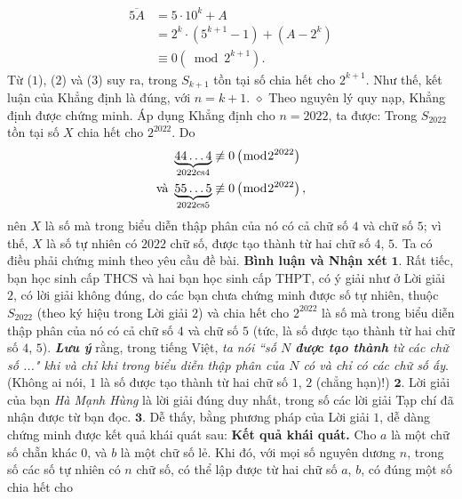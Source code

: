 \begin{multicols}{2}
	\begin{align*}
		\overline {5A}  &= 5 \cdot {10^k} + A \\
		&= {2^k} \cdot \left( {{5^{k + 1}} - 1} \right) + \left( {A - {2^k}} \right)\\
		&\equiv 0\left( {\bmod {2^{k + 1}}} \right). \tag{$3$}
	\end{align*}
	Từ ($1$), ($2$) và ($3$) suy ra, trong $S_{k+1}$  tồn tại số chia hết cho $2^{k+1}$.
	\vskip 0.05cm 
	Như thế, kết luận của Khẳng định là đúng, với $n = k + 1$.
	\vskip 0.05cm
	$\diamond$ Theo nguyên lý quy nạp, Khẳng định được chứng minh.
	\vskip 0.05cm
	Áp dụng Khẳng định cho $n = 2022$, ta được: Trong $S_{2022}$ tồn tại số $X$ chia hết cho $2^{2022}$. Do
	\begin{align*}
		&\underbrace {44 \ldots 4}_{2022{\rm{cs}}4}\not  \equiv 0\left( {\bmod {2^{2022}}} \right)\\
		\text{\color{black} và } &\underbrace {55 \ldots 5}_{2022{\rm{cs}}5}\not  \equiv 0\left( {\bmod {2^{2022}}} \right),
	\end{align*}
	nên $X$ là số mà trong biểu diễn thập phân của nó có cả chữ số $4$ và chữ số $5$; vì thế, $X$ là số tự nhiên có $2022$ chữ số, được tạo thành từ hai chữ số $4$, $5$.
	\vskip 0.05cm
	Ta có điều phải chứng minh theo yêu cầu đề bài.
	\vskip 0.05cm
	\textbf{\color{thachthuctoanhoc}Bình luận và Nhận xét}
	\vskip 0.05cm
	$\pmb{1.}$ Rất tiếc, bạn học sinh cấp THCS và hai bạn học sinh cấp THPT, có ý giải như ở Lời giải $2$, có lời giải không đúng, do các bạn chưa chứng minh được số tự nhiên, thuộc $S_{2022}$ (theo ký hiệu trong Lời giải $2$) và chia hết cho $2^{2022}$ là số mà trong biểu diễn thập phân của nó có cả chữ số $4$ và chữ số $5$ (tức, là số được tạo thành từ hai chữ số $4$, $5$).
	\vskip 0.05cm
	\textbf{\color{thachthuctoanhoc}\textit{Lưu ý}} rằng, trong tiếng Việt, \textit{ta nói ``số $N$ \textbf{\color{thachthuctoanhoc}được tạo thành} từ các chữ số ..." khi và chỉ khi trong biểu diễn thập phân của $N$ có và chỉ có các chữ số ấy}. (Không ai nói, $1$ là số được tạo thành từ hai chữ số $1$, $2$ (chẳng hạn)!)
	\vskip 0.05cm
	$\pmb{2.}$ Lời giải của bạn \textit{Hà Mạnh Hùng} là lời giải đúng duy nhất, trong số các lời giải Tạp chí đã nhận được từ bạn đọc.
	\vskip 0.05cm
	$\pmb{3.}$ Dễ thấy, bằng phương pháp của Lời giải $1$, dễ dàng chứng minh được kết quả khái quát sau:
	\vskip 0.05cm
	\textbf{\color{thachthuctoanhoc}Kết quả khái quát.} Cho $a$ là một chữ số chẵn khác $0$, và $b$ là một chữ số lẻ. Khi đó, với mọi số nguyên dương $n$, trong số các số tự nhiên có $n$ chữ số, có thể lập được từ hai chữ số $a$, $b$, có đúng một số chia hết cho  

\end{multicols}
